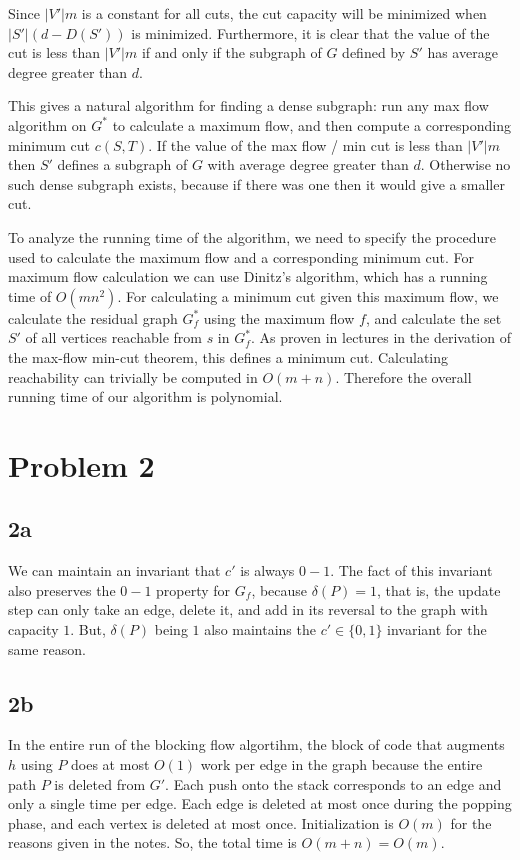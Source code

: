 \documentclass{article}
\begin{document}
Since $|V'|m$ is a constant for all cuts, the cut capacity will be minimized when
$|S'|(d - D(S'))$ is minimized. Furthermore, it is clear that the value of the cut
is less than $|V'|m$ if and only if the subgraph of $G$ defined by $S'$ has
average degree greater than $d$.

This gives a natural algorithm for finding a dense subgraph: run any max flow algorithm
on $G^*$ to calculate a maximum flow, and then compute a corresponding minimum
cut $c(S, T)$. If the value of the max flow / min cut is less than $|V'|m$ then $S'$ defines
a subgraph of $G$ with average degree greater than $d$. Otherwise no such dense subgraph
exists, because if there was one then it would give a smaller cut.

To analyze the running time of the algorithm, we need to specify the procedure used to
calculate the maximum flow and a corresponding minimum cut. For maximum flow calculation
we can use Dinitz's algorithm, which has a running time of $O(mn^2)$. For calculating
a minimum cut given this maximum flow, we calculate the residual graph $G^*_f$ using the
maximum flow $f$, and calculate the set $S'$ of all vertices reachable from $s$ in $G^*_f$.
As proven in lectures in the derivation of the max-flow min-cut theorem, this defines
a minimum cut. Calculating reachability can trivially be computed in $O(m + n)$. Therefore
the overall running time of our algorithm is polynomial.

\section*{Problem 2}
\subsection*{2a}
We can maintain an invariant that $c'$ is always $0-1$. The fact of this
invariant also preserves the $0-1$ property for $G_f$, because $\delta(P) = 1$,
that is, the update step can only take an edge, delete it, and add in its
reversal to the graph with capacity $1$. But, $\delta(P)$ being $1$ also
maintains the $c' \in \{0,1\}$ invariant for the same reason.
\subsection*{2b}
In the entire run of the blocking flow algortihm, the block of code that
augments $h$ using $P$ does at most $O(1)$ work per edge in the graph because
the entire path $P$ is deleted from $G'$. Each push onto the stack corresponds
to an edge and only a single time per edge. Each edge is deleted at most once
during the popping phase, and each vertex is deleted at most once.
Initialization is $O(m)$ for the reasons given in the notes. So, the total time
is $O(m+n) = O(m)$.
\end{document}
